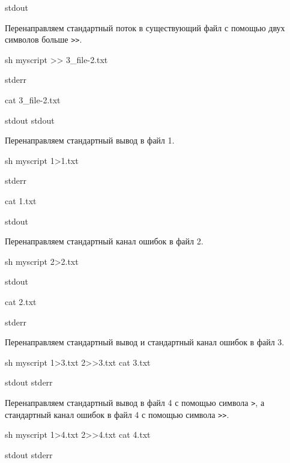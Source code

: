 \begin{OutBox}
stdout
\end{OutBox}

Перенаправляем стандартный поток в существующий файл с помощью двух символов больше \verb|>>|.

\begin{BashBox}
sh myscript >> 3_file-2.txt
\end{BashBox}

\begin{OutBox}
stderr
\end{OutBox}

\begin{BashBox}
cat 3_file-2.txt
\end{BashBox}

\begin{OutBox}
stdout
stdout
\end{OutBox}

Перенаправляем стандартный вывод в файл 1.

\begin{BashBox}
sh myscript 1>1.txt
\end{BashBox}

\begin{OutBox}
stderr
\end{OutBox}

\begin{BashBox}
cat 1.txt
\end{BashBox}

\begin{OutBox}
stdout
\end{OutBox}

Перенаправляем стандартный канал ошибок в файл 2.

\begin{BashBox}
sh myscript 2>2.txt
\end{BashBox}

\begin{OutBox}
stdout
\end{OutBox}

\begin{BashBox}
cat 2.txt
\end{BashBox}

\begin{OutBox}
stderr
\end{OutBox}

Перенаправляем стандартный вывод и стандартный канал ошибок в файл 3.

\begin{BashBox}
sh myscript 1>3.txt 2>>3.txt
cat 3.txt
\end{BashBox}

\begin{OutBox}
stdout
stderr
\end{OutBox}

Перенаправляем стандартный вывод в файл 4 с помощью символа \verb|>|, а стандартный канал ошибок в файл 4 с помощью символа \verb|>>|.

\begin{BashBox}
sh myscript 1>4.txt 2>>4.txt
cat 4.txt
\end{BashBox}

\begin{OutBox}
stdout
stderr
\end{OutBox}
